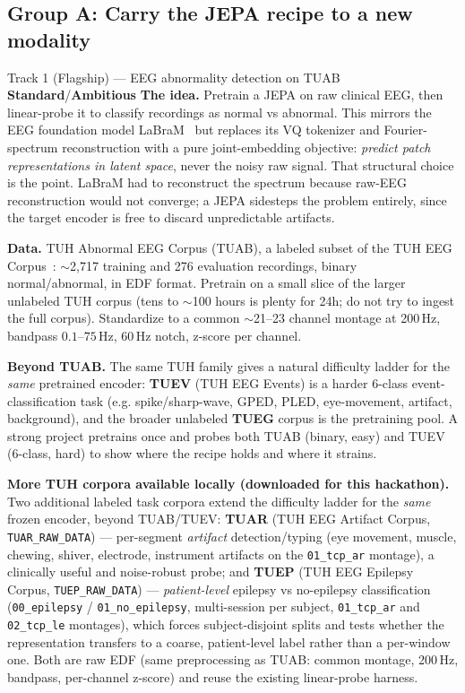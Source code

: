\documentclass{article}
\newcommand{\code}[1]{\texttt{\small #1}}
\newcommand{\diffmed}{\colorbox{ebamber!18}{\textcolor{ebamber}{\small\bfseries Standard}}}
\newcommand{\diffhard}{\colorbox{ebred!15}{\textcolor{ebred}{\small\bfseries Ambitious}}}
\begin{document}
\subsection{Group A: Carry the JEPA recipe to a new modality}

\begin{trackbox}{Track 1 (Flagship) --- EEG abnormality detection on TUAB \hfill \diffmed{}/\diffhard{}}
\textbf{The idea.} Pretrain a JEPA on raw clinical EEG, then linear-probe it to
classify recordings as normal vs abnormal. This mirrors the EEG foundation model
LaBraM~\citep{LaBraM} but replaces its
VQ tokenizer and Fourier-spectrum reconstruction with a pure joint-embedding
objective: \emph{predict patch representations in latent space}, never the noisy
raw signal. That structural choice is the point. LaBraM had to reconstruct the
spectrum because raw-EEG reconstruction would not converge; a JEPA sidesteps the
problem entirely, since the target encoder is free to discard unpredictable
artifacts.

\smallskip
\textbf{Data.} TUH Abnormal EEG Corpus (TUAB), a labeled subset of the TUH EEG
Corpus~\citep{TUEG}: $\sim$2{,}717 training and 276 evaluation recordings, binary normal/abnormal,
in EDF format. Pretrain on a small slice of the larger unlabeled TUH corpus (tens
to $\sim$100 hours is plenty for 24h; do not try to ingest the full corpus).
Standardize to a common $\sim$21--23 channel montage at 200\,Hz, bandpass
$0.1$--$75$\,Hz, 60\,Hz notch, z-score per channel.

\smallskip
\textbf{Beyond TUAB.} The same TUH family gives a natural difficulty ladder for the
\emph{same} pretrained encoder: \textbf{TUEV} (TUH EEG Events) is a harder 6-class
event-classification task (e.g. spike/sharp-wave, GPED, PLED, eye-movement,
artifact, background), and the broader unlabeled \textbf{TUEG} corpus is the
pretraining pool. A strong project pretrains once and probes both TUAB
(binary, easy) and TUEV (6-class, hard) to show where the recipe holds and where it
strains.

\smallskip
\textbf{More TUH corpora available locally (downloaded for this hackathon).} Two
additional labeled task corpora extend the difficulty ladder for the \emph{same}
frozen encoder, beyond TUAB/TUEV: \textbf{TUAR} (TUH EEG Artifact Corpus,
\code{TUAR\_RAW\_DATA}) --- per-segment \emph{artifact} detection/typing (eye movement,
muscle, chewing, shiver, electrode, instrument artifacts on the \code{01\_tcp\_ar}
montage), a clinically useful and noise-robust probe; and \textbf{TUEP} (TUH EEG
Epilepsy Corpus, \code{TUEP\_RAW\_DATA}) --- \emph{patient-level} epilepsy vs
no-epilepsy classification (\code{00\_epilepsy} / \code{01\_no\_epilepsy}, multi-session
per subject, \code{01\_tcp\_ar} and \code{02\_tcp\_le} montages), which forces
subject-disjoint splits and tests whether the representation transfers to a coarse,
patient-level label rather than a per-window one. Both are raw EDF (same preprocessing
as TUAB: common montage, 200\,Hz, bandpass, per-channel z-score) and reuse the existing
linear-probe harness.


\end{trackbox}
\end{document}

